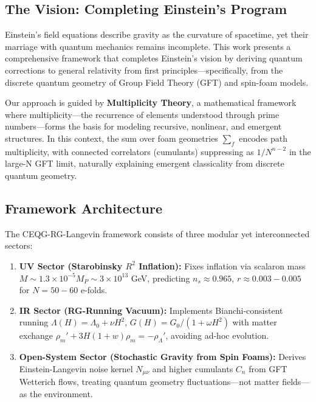 \documentclass[12pt,a4paper]{article}
\begin{document}
\subsection{The Vision: Completing Einstein's Program}

Einstein's field equations describe gravity as the curvature of spacetime, yet their marriage with quantum mechanics remains incomplete. This work presents a comprehensive framework that completes Einstein's vision by deriving quantum corrections to general relativity from first principles—specifically, from the discrete quantum geometry of Group Field Theory (GFT) and spin-foam models.

Our approach is guided by \textbf{Multiplicity Theory}, a mathematical framework where multiplicity—the recurrence of elements understood through prime numbers—forms the basis for modeling recursive, nonlinear, and emergent structures. In this context, the sum over foam geometries \(\sum_f\) encodes path multiplicity, with connected correlators (cumulants) suppressing as \(1/N^{n-2}\) in the large-N GFT limit, naturally explaining emergent classicality from discrete quantum geometry.

\subsection{Framework Architecture}

The CEQG-RG-Langevin framework consists of three modular yet interconnected sectors:

\begin{enumerate}[label=\arabic*.]
\item \textbf{UV Sector (Starobinsky \(R^2\) Inflation):} Fixes inflation via scalaron mass \(M \sim 1.3 \times 10^{-5} M_P \sim 3 \times 10^{13}\) GeV, predicting \(n_s \approx 0.965\), \(r \approx 0.003-0.005\) for \(N=50-60\) e-folds.

\item \textbf{IR Sector (RG-Running Vacuum):} Implements Bianchi-consistent running \(\Lambda(H) = \Lambda_0 + \nu H^2\), \(G(H) = G_0/(1 + \omega H^2)\) with matter exchange \(\rho_m' + 3H(1 + w)\rho_m = -\rho_\Lambda'\), avoiding ad-hoc evolution.

\item \textbf{Open-System Sector (Stochastic Gravity from Spin Foams):} Derives Einstein-Langevin noise kernel \(N_{\mu\nu}\) and higher cumulants \(C_n\) from GFT Wetterich flows, treating quantum geometry fluctuations—not matter fields—as the environment.
\end{enumerate}
\end{document}
